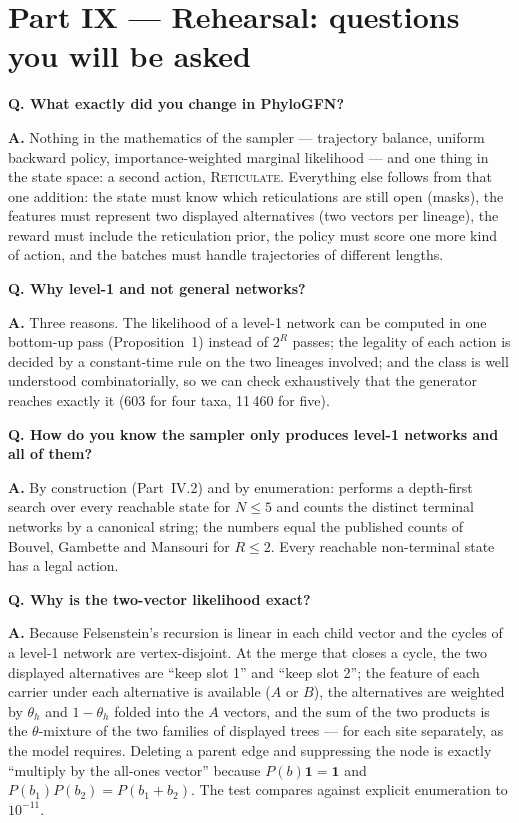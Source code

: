 \section{Part IX --- Rehearsal: questions you will be asked}

\newcommand{\Q}[1]{\par\medskip\noindent\textbf{Q. #1}\par\nobreak\noindent\textbf{A.} }

\Q{What exactly did you change in PhyloGFN?}
Nothing in the mathematics of the sampler --- trajectory balance, uniform backward policy, importance-weighted marginal likelihood --- and one thing in the state space: a second action, \textsc{Reticulate}. Everything else follows from that one addition: the state must know which reticulations are still open (masks), the features must represent two displayed alternatives (two vectors per lineage), the reward must include the reticulation prior, the policy must score one more kind of action, and the batches must handle trajectories of different lengths.

\Q{Why level-1 and not general networks?}
Three reasons. The likelihood of a level-1 network can be computed in one bottom-up pass (Proposition~1) instead of $2^R$ passes; the legality of each action is decided by a constant-time rule on the two lineages involved; and the class is well understood combinatorially, so we can check exhaustively that the generator reaches exactly it (603 for four taxa, 11\,460 for five).

\Q{How do you know the sampler only produces level-1 networks and all of them?}
By construction (Part~IV.2) and by enumeration:  performs a depth-first search over every reachable state for $N\le5$ and counts the distinct terminal networks by a canonical string; the numbers equal the published counts of Bouvel, Gambette and Mansouri for $R\le2$. Every reachable non-terminal state has a legal action.

\Q{Why is the two-vector likelihood exact?}
Because Felsenstein's recursion is linear in each child vector and the cycles of a level-1 network are vertex-disjoint. At the merge that closes a cycle, the two displayed alternatives are ``keep slot 1'' and ``keep slot 2''; the feature of each carrier under each alternative is available ($A$ or $B$), the alternatives are weighted by $\theta_h$ and $1-\theta_h$ folded into the $A$ vectors, and the sum of the two products is the $\theta$-mixture of the two families of displayed trees --- for each site separately, as the model requires. Deleting a parent edge and suppressing the node is exactly ``multiply by the all-ones vector'' because $P(b)\mathbf1=\mathbf1$ and $P(b_1)P(b_2)=P(b_1+b_2)$. The test compares against explicit enumeration to $10^{-11}$.

